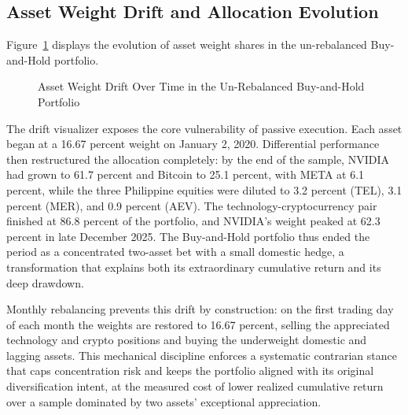 \subsection{Asset Weight Drift and Allocation Evolution}

Figure~\ref{fig:rebalanced-weights} displays the evolution of asset weight shares in the un-rebalanced Buy-and-Hold portfolio.

\begin{figure}[H]
  \centering
  \caption{Asset Weight Drift Over Time in the Un-Rebalanced Buy-and-Hold Portfolio}
  \label{fig:rebalanced-weights}
\end{figure}

The drift visualizer exposes the core vulnerability of passive execution. Each asset began at a 16.67 percent weight on January 2, 2020. Differential performance then restructured the allocation completely: by the end of the sample, NVIDIA had grown to 61.7 percent and Bitcoin to 25.1 percent, with META at 6.1 percent, while the three Philippine equities were diluted to 3.2 percent (TEL), 3.1 percent (MER), and 0.9 percent (AEV). The technology-cryptocurrency pair finished at 86.8 percent of the portfolio, and NVIDIA's weight peaked at 62.3 percent in late December 2025. The Buy-and-Hold portfolio thus ended the period as a concentrated two-asset bet with a small domestic hedge, a transformation that explains both its extraordinary cumulative return and its deep drawdown.

Monthly rebalancing prevents this drift by construction: on the first trading day of each month the weights are restored to 16.67 percent, selling the appreciated technology and crypto positions and buying the underweight domestic and lagging assets. This mechanical discipline enforces a systematic contrarian stance that caps concentration risk and keeps the portfolio aligned with its original diversification intent, at the measured cost of lower realized cumulative return over a sample dominated by two assets' exceptional appreciation.
